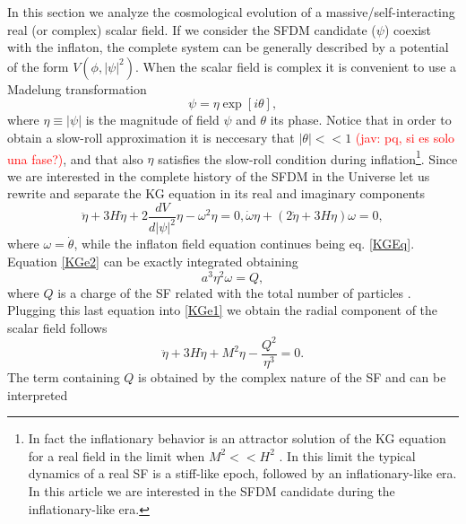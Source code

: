 \documentclass[amssymb,twocolumn,prd,nofootinbib,showpacs]{revtex4-1}
\newcommand{\jav}[1]{\textcolor{red}{(jav: #1)}}
\begin{document}
In this section we analyze the cosmological evolution of a massive/self-interacting real (or complex) scalar field. 
If we consider the SFDM candidate ($\psi$) coexist with the inflaton, the complete system can be generally 
described by a potential of the form $V(\phi,|\psi|^2)$. When the scalar field is complex it is convenient 
to use a Madelung transformation \cite{madelung}
%
\begin{equation}
\psi = \eta \exp[i\theta],
\end{equation}
%
where $\eta\equiv |\psi|$ is the magnitude of field $\psi$ and $\theta$ its phase.
Notice that in order to obtain a slow-roll approximation it is neccesary that $|\theta|<<1$ \jav{pq, si es solo una fase?},
 and that also $\eta$ satisfies the slow-roll condition during 
 inflation\footnote{In fact the inflationary behavior is an attractor solution of the KG equation 
 for a real field in the limit when $M^2<<H^2$ \cite{atractorinf1,atractorinf2}. 
 In this limit the typical dynamics of a real SF is a stiff-like epoch, followed by an inflationary-like era. 
 In this article we are interested in the SFDM 
 candidate during the inflationary-like era.}.
Since we are interested in the complete history of the SFDM in the Universe let us 
rewrite and separate the KG equation in its real and imaginary components
%
\begin{subequations}\label{KESFDM}
\begin{equation}\label{KGe1}
\ddot\eta+3H\dot\eta+2\frac{dV}{d|\psi|^2}\eta-\omega^2\eta= 0,
\end{equation}
\begin{equation}\label{KGe2}
\dot\omega \eta + (2\dot\eta+3H\eta)\omega=0,
\end{equation}
\end{subequations}
%
where $\omega = \dot \theta$, while the inflaton field equation continues 
being eq. \eqref{KGEq}. Equation \eqref{KGe2} can be exactly integrated obtaining 
%
\begin{equation}
a^3\eta^2\omega=Q,
\end{equation}
%
where $Q$ is a charge of the SF related with the total number of 
particles \cite{SFphi42,charge1,SFphi41,charge3,charge4}. Plugging this last equation into \eqref{KGe1} we obtain
the radial component of the scalar field follows
%
\begin{equation}\label{KGe3}
\ddot\eta+3H\dot\eta+M^2\eta-\frac{Q^2}{\eta^3}= 0.
\end{equation}
%
The term containing $Q$ is obtained by the complex nature of the SF \cite{SFphi42} and can be interpreted 
\end{document}
